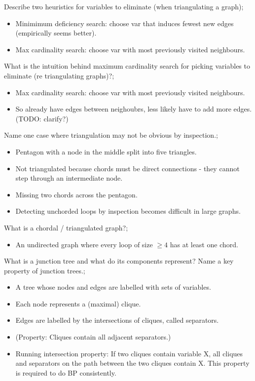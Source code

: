 \documentclass{article}
\begin{document}
Describe two heuristics for variables to eliminate (when triangulating a graph); \begin{itemize} \item Minimimum deficiency search: choose var that induces fewest new edges (empirically seems better).  \item Max cardinality search: choose var with most previously visited neighbours.  \end{itemize}
    
What is the intuition behind maximum cardinality search for picking variables to eliminate (re triangulating graphs)?; \begin{itemize} \item Max cardinality search: choose var with most previously visited neighbours.  \item So already have edges between neighoubrs, less likely have to add more edges. (TODO: clarify?) \end{itemize}

Name one case where triangulation may not be obvious by inspection.; \begin{itemize} \item Pentagon with a node in the middle split into five triangles.  \item Not triangulated because chords must be direct connections - they cannot step through an intermediate node.  \item Missing two chords across the pentagon.  \item Detecting unchorded loops by inspection becomes difficult in large graphs.  \end{itemize}

What is a chordal / triangulated graph?; \begin{itemize} \item An undirected graph where every loop of size $\geq 4$ has at least one chord.  \end{itemize}

What is a junction tree and what do its components represent? Name a key property of junction trees.;\begin{itemize} \item  A tree whose nodes and edges are labelled with sets of variables. \item Each node represents a (maximal) clique.  \item Edges are labelled by the intersections of cliques, called separators.  \item (Property: Cliques contain all adjacent separators.) \item Running intersection property: If two cliques contain variable X, all cliques and separators on the path between the two cliques contain X. This property is required to do BP consistently.  \end{itemize}
\end{document}
